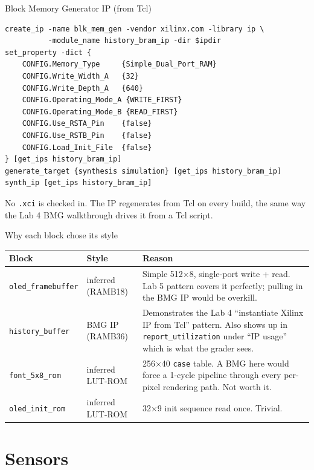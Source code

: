 \documentclass[aspectratio=169,10pt]{beamer}
\begin{document}
\begin{frame}[fragile]{Block Memory Generator IP (from Tcl)}
\begin{lstlisting}[style=tcl]
create_ip -name blk_mem_gen -vendor xilinx.com -library ip \
          -module_name history_bram_ip -dir $ipdir
set_property -dict {
    CONFIG.Memory_Type     {Simple_Dual_Port_RAM}
    CONFIG.Write_Width_A   {32}
    CONFIG.Write_Depth_A   {640}
    CONFIG.Operating_Mode_A {WRITE_FIRST}
    CONFIG.Operating_Mode_B {READ_FIRST}
    CONFIG.Use_RSTA_Pin    {false}
    CONFIG.Use_RSTB_Pin    {false}
    CONFIG.Load_Init_File  {false}
} [get_ips history_bram_ip]
generate_target {synthesis simulation} [get_ips history_bram_ip]
synth_ip [get_ips history_bram_ip]
\end{lstlisting}
    \scriptsize No \texttt{.xci} is checked in. The IP regenerates from
    Tcl on every build, the same way the Lab 4 BMG walkthrough drives
    it from a Tcl script.
\end{frame}

\begin{frame}{Why each block chose its style}
    \small
    \begin{tabular}{p{34mm} p{30mm} p{60mm}}
        \toprule
        Block & Style & Reason \\
        \midrule
        \texttt{oled\_framebuffer} & inferred (RAMB18) &
            Simple 512$\times$8, single-port write + read. Lab 5 pattern
            covers it perfectly; pulling in the BMG IP would be
            overkill. \\
        \texttt{history\_buffer} & BMG IP (RAMB36) &
            Demonstrates the Lab 4 ``instantiate Xilinx IP from
            Tcl'' pattern. Also shows up in \texttt{report\_utilization}
            under ``IP usage'' which is what the grader sees. \\
        \texttt{font\_5x8\_rom} & inferred LUT-ROM &
            256$\times$40 \texttt{case} table. A BMG here would force
            a 1-cycle pipeline through every per-pixel rendering path.
            Not worth it. \\
        \texttt{oled\_init\_rom} & inferred LUT-ROM &
            32$\times$9 init sequence read once. Trivial. \\
        \bottomrule
    \end{tabular}
\end{frame}

\section{Sensors}
\end{document}
